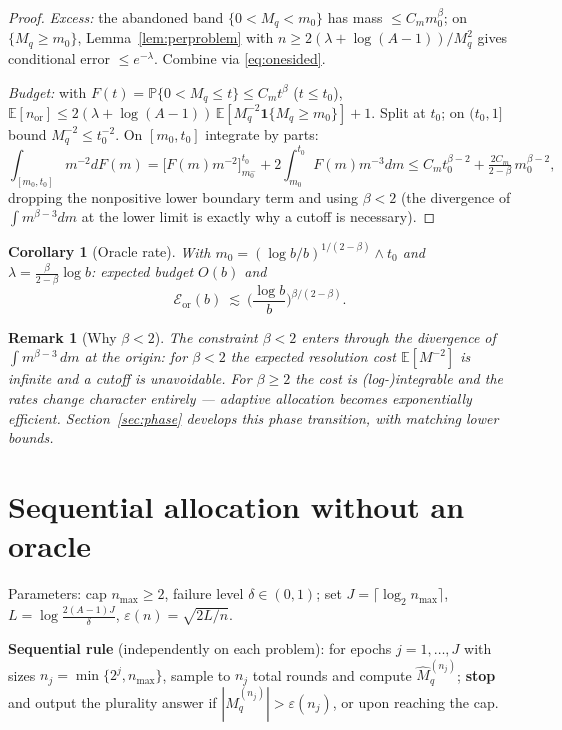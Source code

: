 \documentclass[11pt]{article}
\newtheorem{corollary}{Corollary}
\newtheorem{remark}{Remark}
\newcommand{\E}{\mathbb E}
\newcommand{\Pp}{\mathbb P}
\newcommand{\one}{\mathbf 1}
\newcommand{\eps}{\varepsilon}
\newcommand{\Mhat}{\widehat M}
\newcommand{\nmax}{n_{\max}}
\begin{document}
\begin{proof}
\emph{Excess:} the abandoned band $\{0<M_q<m_0\}$ has mass $\le C_mm_0^\beta$;
on $\{M_q\ge m_0\}$, Lemma~\ref{lem:perproblem} with
$n\ge2(\lambda+\log(A-1))/M_q^2$ gives conditional error $\le e^{-\lambda}$.
Combine via \eqref{eq:onesided}.

\emph{Budget:} with $F(t)=\Pp\{0<M_q\le t\}\le C_mt^\beta$ ($t\le t_0$),
$\E[n_{\mathrm{or}}]\le2(\lambda+\log(A-1))\,\E[M_q^{-2}\one\{M_q\ge
m_0\}]+1$.  Split at $t_0$; on $(t_0,1]$ bound $M_q^{-2}\le t_0^{-2}$.  On
$[m_0,t_0]$ integrate by parts:
\[
\int_{[m_0,t_0]}m^{-2}dF(m)
=\big[F(m)m^{-2}\big]_{m_0^-}^{t_0}+2\int_{m_0}^{t_0}F(m)m^{-3}dm
\le C_mt_0^{\beta-2}+\tfrac{2C_m}{2-\beta}\,m_0^{\beta-2},
\]
dropping the nonpositive lower boundary term and using $\beta<2$ (the
divergence of $\int m^{\beta-3}dm$ at the lower limit is exactly why a
cutoff is necessary).
\end{proof}

\begin{corollary}[Oracle rate]
\label{cor:oracle-rate}
With $m_0=(\log b/b)^{1/(2-\beta)}\wedge t_0$ and
$\lambda=\tfrac{\beta}{2-\beta}\log b$: expected budget $O(b)$ and
\[
\mathcal E_{\mathrm{or}}(b)
\ \lesssim\
\Big(\frac{\log b}{b}\Big)^{\beta/(2-\beta)} .
\]
\end{corollary}

\begin{remark}[Why $\beta<2$]
\label{rem:phase}
The constraint $\beta<2$ enters through the divergence of
$\int m^{\beta-3}\,dm$ at the origin: for $\beta<2$ the expected resolution
cost $\E[M^{-2}]$ is infinite and a cutoff is unavoidable.  For $\beta\ge2$
the cost is (log-)integrable and the rates change character entirely ---
adaptive allocation becomes exponentially efficient.
Section~\ref{sec:phase} develops this phase transition, with matching lower
bounds.
\end{remark}

\section{Sequential allocation without an oracle}
\label{sec:sequential}

Parameters: cap $\nmax\ge2$, failure level $\delta\in(0,1)$; set
$J=\lceil\log_2\nmax\rceil$, $L=\log\frac{2(A-1)J}{\delta}$,
$\eps(n)=\sqrt{2L/n}$.

\medskip
\noindent\textbf{Sequential rule} (independently on each problem):
for epochs $j=1,\dots,J$ with sizes $n_j=\min\{2^j,\nmax\}$, sample to $n_j$
total rounds and compute $\Mhat^{(n_j)}_q$; \textbf{stop} and output the
plurality answer if $|\Mhat^{(n_j)}_q|>\eps(n_j)$, or upon reaching the cap.
\end{document}
